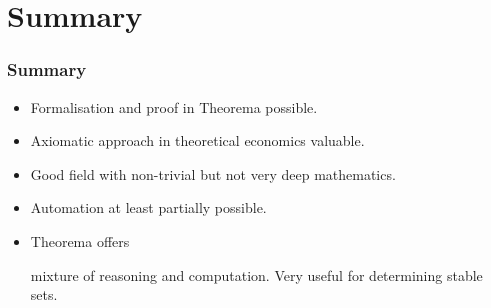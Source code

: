 \documentclass{beamer}
\def\mcolor#1#2{\rule{0ex}{0ex}\color{#1}#2\color{black}{}}
\begin{document}
\section{Summary}
\begin{frame}
\frametitle{Summary}

\begin{itemize}
\item \mcolor{blue}{Formalisation and proof} in Theorema possible.
\item Axiomatic approach in theoretical economics valuable.
\item Good field with non-trivial but not very deep mathematics.
\item Automation at least partially possible.
\item Theorema offers \mcolor{blue}{mixture of reasoning and
    computation}. Very useful for determining stable sets.
\end{itemize}
\end{frame}
\end{document}
